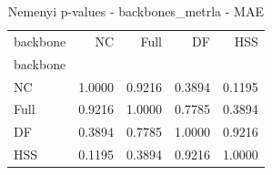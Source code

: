 \begin{table}
\caption{Nemenyi p-values - backbones_metrla - MAE}
\label{tab:nemenyi_backbones_metrla_mae}
\begin{tabular}{lrrrr}
\toprule
backbone & NC & Full & DF & HSS \\
backbone &  &  &  &  \\
\midrule
NC & 1.0000 & 0.9216 & 0.3894 & 0.1195 \\
Full & 0.9216 & 1.0000 & 0.7785 & 0.3894 \\
DF & 0.3894 & 0.7785 & 1.0000 & 0.9216 \\
HSS & 0.1195 & 0.3894 & 0.9216 & 1.0000 \\
\bottomrule
\end{tabular}
\end{table}
